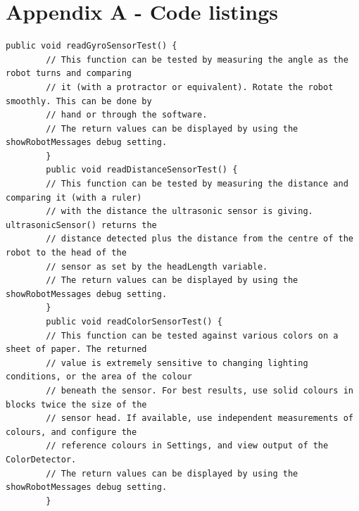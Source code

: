 \documentclass[12pt,a4paper]{article}
\begin{document}
	\section{Appendix A - Code listings}
	\begin{lstlisting}[caption=Sensor manual test suite, captionpos=b, label={lst:SensorManualTestSuite}]
	public void readGyroSensorTest() {
        // This function can be tested by measuring the angle as the robot turns and comparing
        // it (with a protractor or equivalent). Rotate the robot smoothly. This can be done by 
        // hand or through the software.
        // The return values can be displayed by using the showRobotMessages debug setting.
        }
        public void readDistanceSensorTest() {
        // This function can be tested by measuring the distance and comparing it (with a ruler) 
        // with the distance the ultrasonic sensor is giving. ultrasonicSensor() returns the 
        // distance detected plus the distance from the centre of the robot to the head of the 
        // sensor as set by the headLength variable.
        // The return values can be displayed by using the showRobotMessages debug setting.
        }
        public void readColorSensorTest() {
        // This function can be tested against various colors on a sheet of paper. The returned 
        // value is extremely sensitive to changing lighting conditions, or the area of the colour 
        // beneath the sensor. For best results, use solid colours in blocks twice the size of the 
        // sensor head. If available, use independent measurements of colours, and configure the
        // reference colours in Settings, and view output of the ColorDetector.
        // The return values can be displayed by using the showRobotMessages debug setting.
        }
	\end{lstlisting}
\end{document}
